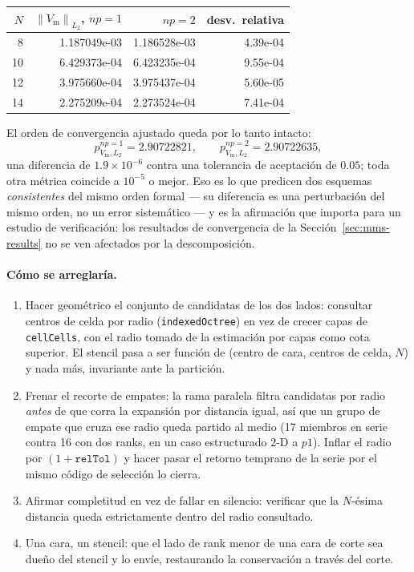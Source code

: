 \documentclass[11pt,a4paper]{article}
\newcommand{\code}[1]{\texttt{\small #1}}
\newcommand{\Vm}{V_{\text{m}}}
\newcommand{\norm}[1]{\left\lVert #1 \right\rVert}
\begin{document}
\begin{center}
\begin{tabular}{@{}rrrr@{}}
\toprule
$N$ & $\norm{\Vm}_{L_2}$, $np=1$ & $np=2$ & desv.\ relativa \\
\midrule
 8 & 1.187049e-03 & 1.186528e-03 & 4.39e-04 \\
10 & 6.429373e-04 & 6.423235e-04 & 9.55e-04 \\
12 & 3.975660e-04 & 3.975437e-04 & 5.60e-05 \\
14 & 2.275209e-04 & 2.273524e-04 & 7.41e-04 \\
\bottomrule
\end{tabular}
\end{center}

El orden de convergencia ajustado queda por lo tanto intacto:
\[
  p^{np=1}_{\Vm,L_2} = 2.90722821,
  \qquad
  p^{np=2}_{\Vm,L_2} = 2.90722635,
\]
una diferencia de $1.9\times10^{-6}$ contra una tolerancia de aceptación de
$0.05$; toda otra métrica coincide a $10^{-5}$ o mejor. Eso es lo que predicen
dos esquemas \emph{consistentes} del mismo orden formal --- su diferencia es una
perturbación del mismo orden, no un error sistemático --- y es la afirmación que
importa para un estudio de verificación: los resultados de convergencia de la
Sección~\ref{sec:mms-results} no se ven afectados por la descomposición.

\paragraph{Cómo se arreglaría.}
\begin{enumerate}
  \item Hacer geométrico el conjunto de candidatas de los dos lados: consultar
        centros de celda por radio (\code{indexedOctree}) en vez de crecer capas
        de \code{cellCells}, con el radio tomado de la estimación por capas como
        cota superior. El stencil pasa a ser función de (centro de cara, centros
        de celda, $N$) y nada más, invariante ante la partición.
  \item Frenar el recorte de empates: la rama paralela filtra candidatas por
        radio \emph{antes} de que corra la expansión por distancia igual, así
        que un grupo de empate que cruza ese radio queda partido al medio (17
        miembros en serie contra 16 con dos ranks, en un caso estructurado 2-D a
        $p1$). Inflar el radio por $(1+\texttt{relTol})$ y hacer pasar el retorno
        temprano de la serie por el mismo código de selección lo cierra.
  \item Afirmar completitud en vez de fallar en silencio: verificar que la
        $N$-ésima distancia queda estrictamente dentro del radio consultado.
  \item Una cara, un stencil: que el lado de rank menor de una cara de corte sea
        dueño del stencil y lo envíe, restaurando la conservación a través del
        corte.
\end{enumerate}
\end{document}
